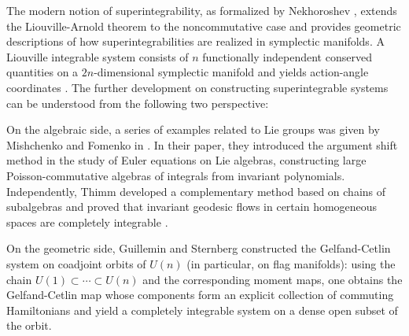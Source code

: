 \documentclass[11pt,reqno]{amsart}
\newtheorem*{theorem A}{Main Theorem A}
\newtheorem*{theorem B}{Main Theorem B}
\newtheorem*{theorem C}{Main Theorem C}
\newtheorem*{theorem D}{Main Theorem D}
\theoremstyle{definition}
\theoremstyle{plain}
\theoremstyle{conclusion}
\begin{document}
The modern notion of superintegrability, as formalized by Nekhoroshev \cite{nehorovsev1968action}, extends the Liouville-Arnold theorem to the noncommutative case and provides geometric descriptions of how superintegrabilities are realized in symplectic manifolds.  A Liouville integrable system consists of $n$ functionally independent conserved quantities on a $2n$-dimensional symplectic manifold and yields action-angle coordinates \cite{nehorovsev1968action,MR997295}. The further development on constructing superintegrable systems can be understood from the following two perspective:

On the algebraic side, a series of examples related to Lie groups was given by Mishchenko and Fomenko in \cite{Mishchenkofomenko1978}. In their paper, they introduced the argument shift method in the study of Euler equations on Lie algebras, constructing large Poisson-commutative algebras of integrals from invariant polynomials. Independently, Thimm developed a complementary method based on chains of subalgebras and proved that invariant geodesic flows in certain homogeneous spaces are completely integrable \cite{Thimm1981}.

On the geometric side, Guillemin and Sternberg\cite{GuilleminSternberg1983} constructed the Gelfand-Cetlin system on coadjoint orbits of $U(n)$ (in particular, on flag manifolds): using the chain $U(1)\subset\cdots\subset U(n)$ and the corresponding moment maps, one obtains the Gelfand-Cetlin map whose components form an explicit collection of commuting Hamiltonians and yield a completely integrable system on a dense open subset of the orbit. %
\end{document}
